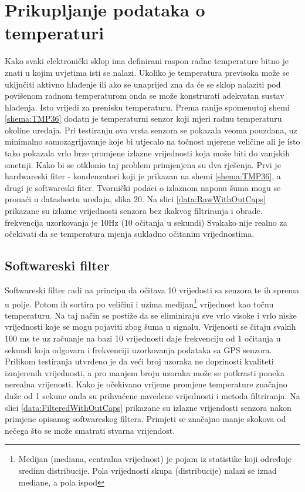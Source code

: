 \section{Prikupljanje podataka o temperaturi}\label{sec:TempData}
Kako svaki elektronički sklop ima definirani raspon radne temperature bitno je znati u kojim uvjetima isti se nalazi.
Ukoliko je temperatura previsoka može se uključiti aktivno hlađenje ili ako se unaprijed zna da će se sklop nalaziti pod povišenom radnom temperaturom onda se može konstrurati adekvatan sustav hlađenja.
Isto vrijedi za prenisku temperaturu.
Prema ranije spomenutoj shemi \ref{shema:TMP36} dodatn je temperaturni senzor koji mjeri radnu temperaturu okoline uređaja.
Pri testiranju ova vrsta senzora se pokazala veoma pouzdana, uz minimalno samozagrijavanje koje bi utjecalo na točnost mjerene veličine ali je isto tako pokazala vrlo brze promjene izlazne vrijednosti koja može biti do vanjskih smetnji.
Kako bi se otklonio taj problem primjenjena su dva rješenja.
Prvi je hardwareski fiter - kondenzatori koji je prikazan na shemi \ref{shema:TMP36}, a drugi je softwareski fiter.
Tvornički podaci o izlaznom naponu šuma mogu se pronaći u datasheetu uređaja, slika 20.
Na slici \ref{data:RawWithOutCaps} prikazane su izlazne vrijednosti senzora bez ikakvog filtriranja i obrade.
frekvencija uzorkovanja je 10Hz (10 očitanja u sekundi)
Svakako nije realno za očekivati da se temperatura mjenja sukladno očitanim vrijednostima.

\subsection{Softwareski filter}
Softwareski filter radi na principu da očitava 10 vrijedosti sa senzora te ih sprema u polje.
Potom ih sortira po veličini i uzima medijan\footnote{Medijan (mediana, centralna vrijednost) je pojam iz statistike koji određuje sredinu distribucije. Pola vrijednosti skupa (distribucije) nalazi se iznad mediane, a pola ispod} vrijednost kao točnu temperaturu.
Na taj način se postiže da se eliminiraju sve vrlo visoke i vrlo niske vrijednosti koje se mogu pojaviti zbog šuma u signalu.
Vrijenosti se čitaju svakih 100 ms te uz račuanje na bazi 10 vrijednosti daje frekvenciju od 1 očitanja u sekundi koja odgovara i frekvenciji uzorkovanja podataka sa GPS senzora.
Prilikom testiranja utvrđeno je da veći broj uzoraka ne doprinosti kvaliteti izmjerenih vrijednosti, a pro manjem broju uzoraka može se potkrasti poneka nerealna vrijenosti.
Kako je očekivano vrijeme promjene temperature značajno duže od 1 sekune onda su prihvaćene navedene vrijednosti i metoda filtriranja.
Na slici \ref{data:FilteredWithOutCaps} prikazane su izlazne vrijendosti senzora nakon primjene opisanog softwareskog filtera.
Primjeti se značajno manje skokova od nečega što se može smatrati stvarna vrijendost. 

